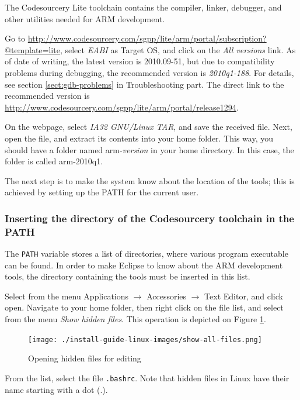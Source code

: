 \documentclass[a4paper, 10pt]{article}
\begin{document}
The Codesourcery Lite toolchain contains
the compiler, linker, debugger, and other utilities needed for
ARM development.

Go to
\url{http://www.codesourcery.com/sgpp/lite/arm/portal/subscription?@template=lite},
select \emph{EABI} as Target OS, and click on the
\emph{All versions} link.
As of date of writing, the latest version is 2010.09-51, but
due to compatibility problems during debugging, the recommended version is \emph{2010q1-188}.
For details, see section \ref{sect:gdb-problems} in Troubleshooting part.
The direct link to the recommended version is
\url{http://www.codesourcery.com/sgpp/lite/arm/portal/release1294}.

On the webpage, select \emph{IA32 GNU/Linux TAR},
and save the received file.
Next, open the file, and extract its contents into your home folder.
This way, you should have a folder named arm-\textit{version} in your home directory.
In this case, the folder is called arm-2010q1.

The next step is to make the system know about the location of the tools;
this is achieved by setting up the PATH for the current user.

\subsubsection{Inserting the directory of the Codesourcery toolchain in the PATH}

    \label{sect:change-path}
The \verb+PATH+ variable stores a list of directories, where various
program executable can be found. In order to make Eclipse to know about the
ARM development tools, the directory containing the tools must be inserted
in this list.

Select from the menu Applications $\rightarrow$ Accessories $\rightarrow$ Text Editor,
and click open. Navigate to your home folder, then right click on the file list,
and select from the menu \emph{Show hidden files}. This operation is depicted on Figure
\ref{fig:show-hidden-files}.

    \begin{figure}[H]
    \centering
        \texttt{[image: ./install-guide-linux-images/show-all-files.png]}
        \caption{Opening hidden files for editing}
        \label{fig:show-hidden-files}
    \end{figure}

From the list, select the file \verb+.bashrc+. Note that hidden files in Linux
have their name starting with a dot (.).
\end{document}
